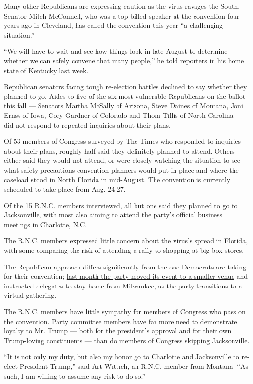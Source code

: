 Many other Republicans are expressing caution as the virus ravages the
South. Senator Mitch McConnell, who was a top-billed speaker at the
convention four years ago in Cleveland, has called the convention this
year ``a challenging situation.''

``We will have to wait and see how things look in late August to
determine whether we can safely convene that many people,'' he told
reporters in his home state of Kentucky last week.

Republican senators facing tough re-election battles declined to say
whether they planned to go. Aides to five of the six most vulnerable
Republicans on the ballot this fall --- Senators Martha McSally of
Arizona, Steve Daines of Montana, Joni Ernst of Iowa, Cory Gardner of
Colorado and Thom Tillis of North Carolina --- did not respond to
repeated inquiries about their plans.

Of 53 members of Congress surveyed by The Times who responded to
inquiries about their plans, roughly half said they definitely planned
to attend. Others either said they would not attend, or were closely
watching the situation to see what safety precautions convention
planners would put in place and where the caseload stood in North
Florida in mid-August. The convention is currently scheduled to take
place from Aug. 24-27.

Of the 15 R.N.C. members interviewed, all but one said they planned to
go to Jacksonville, with most also aiming to attend the party's official
business meetings in Charlotte, N.C.

The R.N.C. members expressed little concern about the virus's spread in
Florida, with some comparing the risk of attending a rally to shopping
at big-box stores.

The Republican approach differs significantly from the one Democrats are
taking for their convention;
\href{https://www.nytimes.com/2020/06/24/us/politics/democratic-convention-milwaukee-coronavirus.html}{last
month the party moved its event to a smaller venue} and instructed
delegates to stay home from Milwaukee, as the party transitions to a
virtual gathering.

The R.N.C. members have little sympathy for members of Congress who pass
on the convention. Party committee members have far more need to
demonstrate loyalty to Mr. Trump --- both for the president's approval
and for their own Trump-loving constituents --- than do members of
Congress skipping Jacksonville.

``It is not only my duty, but also my honor go to Charlotte and
Jacksonville to re-elect President Trump,'' said Art Wittich, an R.N.C.
member from Montana. ``As such, I am willing to assume any risk to do
so.''

